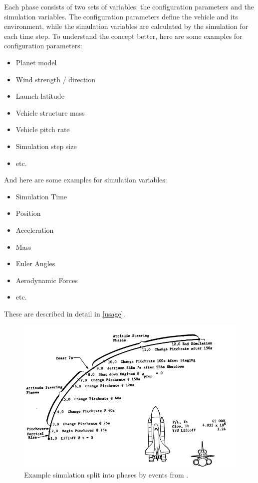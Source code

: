 Each phase consists of two sets of variables: the configuration parameters and
the simulation variables. The configuration parameters define the vehicle and
its environment, while the simulation variables are calculated by the
simulation for each time step. To understand the concept better, here are some
examples for configuration parameters:
\begin{itemize}
  \item Planet model
  \item Wind strength / direction
  \item Launch latitude
  \item Vehicle structure mass
  \item Vehicle pitch rate
  \item Simulation step size
  \item etc.
\end{itemize} And here are some examples for simulation variables:
\begin{itemize}
  \item Simulation Time
  \item Position
  \item Acceleration
  \item Mass
  \item Euler Angles
  \item Aerodynamic Forces
  \item etc.
\end{itemize}

These are described in detail in \cref{usage}.

\begin{figure}[!ht]
  \centering
  \includegraphics[width=\textwidth]{images/example.png}
  \caption{Example simulation split into phases by events from \cite[Fig. 28]{PostSummary}.}
  \label{example}
\end{figure}

